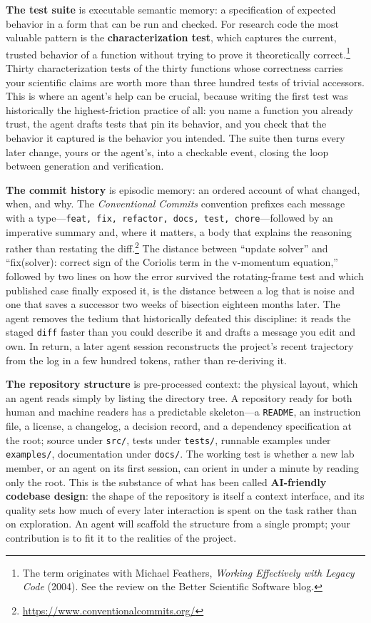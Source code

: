 \documentclass{IEEEcsmag}
\begin{document}
\textbf{The test suite} is executable semantic memory: a specification of expected behavior in a form that can be run and checked. For research code the most valuable pattern is the \textbf{characterization test}, which captures the current, trusted behavior of a function without trying to prove it theoretically correct.\footnote{The term originates with Michael Feathers, \emph{Working Effectively with Legacy Code} (2004).\cite{feathers2004} See the review on the Better Scientific Software blog.\cite{bartlett2019}} Thirty characterization tests of the thirty functions whose correctness carries your scientific claims are worth more than three hundred tests of trivial accessors. This is where an agent's help can be crucial, because writing the first test was historically the highest-friction practice of all: you name a function you already trust, the agent drafts tests that pin its behavior, and you check that the behavior it captured is the behavior you intended. The suite then turns every later change, yours or the agent's, into a checkable event, closing the loop between generation and verification.

\textbf{The commit history} is episodic memory: an ordered account of what changed, when, and why. The \emph{Conventional Commits} convention prefixes each message with a type---\texttt{feat, fix, refactor, docs, test, chore}---followed by an imperative summary and, where it matters, a body that explains the reasoning rather than restating the diff.\footnote{\url{https://www.conventionalcommits.org/}} The distance between ``update solver'' and ``fix(solver): correct sign of the Coriolis term in the v-momentum equation,'' followed by two lines on how the error survived the rotating-frame test and which published case finally exposed it, is the distance between a log that is noise and one that saves a successor two weeks of bisection eighteen months later. The agent removes the tedium that historically defeated this discipline: it reads the staged \texttt{diff} faster than you could describe it and drafts a message you edit and own. In return, a later agent session reconstructs the project's recent trajectory from the log in a few hundred tokens, rather than re-deriving it.

\textbf{The repository structure} is pre-processed context: the physical layout, which an agent reads simply by listing the directory tree. A repository ready for both human and machine readers has a predictable skeleton---a \texttt{README}, an instruction file, a license, a changelog, a decision record, and a dependency specification at the root; source under \texttt{src/}, tests under \texttt{tests/}, runnable examples under \texttt{examples/}, documentation under \texttt{docs/}. The working test is whether a new lab member, or an agent on its first session, can orient in under a minute by reading only the root. This is the substance of what has been called \textbf{AI-friendly codebase design}: the shape of the repository is itself a context interface, and its quality sets how much of every later interaction is spent on the task rather than on exploration.\cite{boeckeler2026} An agent will scaffold the structure from a single prompt; your contribution is to fit it to the realities of the project.
\end{document}
